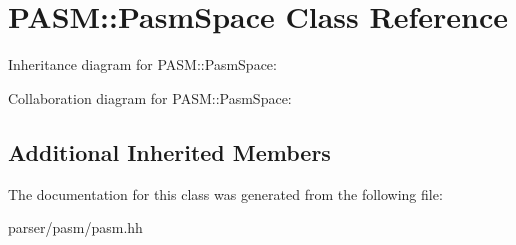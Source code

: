 \hypertarget{classPASM_1_1PasmSpace}{}\section{P\+A\+SM\+:\+:Pasm\+Space Class Reference}
\label{classPASM_1_1PasmSpace}


Inheritance diagram for P\+A\+SM\+:\+:Pasm\+Space\+:


Collaboration diagram for P\+A\+SM\+:\+:Pasm\+Space\+:
\subsection*{Additional Inherited Members}


The documentation for this class was generated from the following file\+:\begin{DoxyCompactItemize}
\item 
parser/pasm/pasm.\+hh\end{DoxyCompactItemize}
